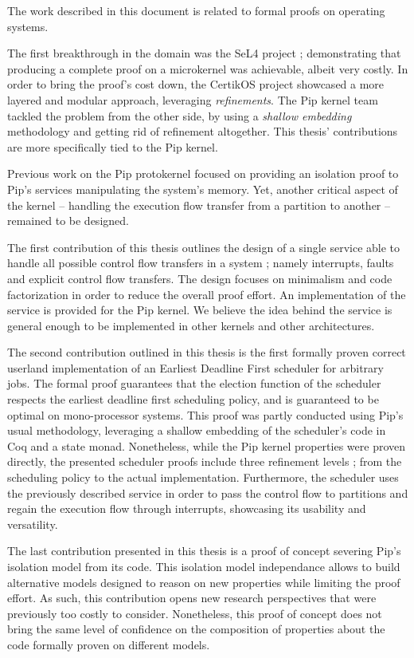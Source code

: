 The work described in this document is related to formal proofs on operating systems.

The first breakthrough in the domain was the SeL4 project ; demonstrating that producing a complete proof on a microkernel was achievable, albeit very costly. 
In order to bring the proof's cost down, the CertikOS project showcased a more layered and modular approach, leveraging \emph{refinements}.
The Pip kernel team tackled the problem from the other side, by using a \emph{shallow embedding} methodology and getting rid of refinement altogether. This thesis' contributions are more specifically tied to the Pip kernel.

Previous work on the Pip protokernel focused on providing an isolation proof to Pip's services manipulating the system's memory. Yet, another critical aspect of the kernel -- handling the execution flow transfer from a partition to another -- remained to be designed.

The first contribution of this thesis outlines the design of a single service able to handle all possible control flow transfers in a system ; namely interrupts, faults and explicit control flow transfers. The design focuses on minimalism and code factorization in order to reduce the overall proof effort. An implementation of the service is provided for the Pip kernel. We believe the idea behind the service is general enough to be implemented in other kernels and other architectures.

The second contribution outlined in this thesis is the first formally proven correct userland implementation of an Earliest Deadline First scheduler for arbitrary jobs. The formal proof guarantees that the election function of the scheduler respects the earliest deadline first scheduling policy, and is guaranteed to be optimal on mono-processor systems. This proof was partly conducted using Pip's usual methodology, leveraging a shallow embedding of the scheduler's code in Coq and a state monad. Nonetheless, while the Pip kernel properties were proven directly, the presented scheduler proofs include three refinement levels ; from the scheduling policy to the actual implementation. Furthermore, the scheduler uses the previously described service in order to pass the control flow to partitions and regain the execution flow through interrupts, showcasing its usability and versatility.

The last contribution presented in this thesis is a proof of concept severing Pip's isolation model from its code. This isolation model independance allows to build alternative models designed to reason on new properties while limiting the proof effort. As such, this contribution opens new research perspectives that were previously too costly to consider. Nonetheless, this proof of concept does not bring the same level of confidence on the composition of properties about the code formally proven on different models.

